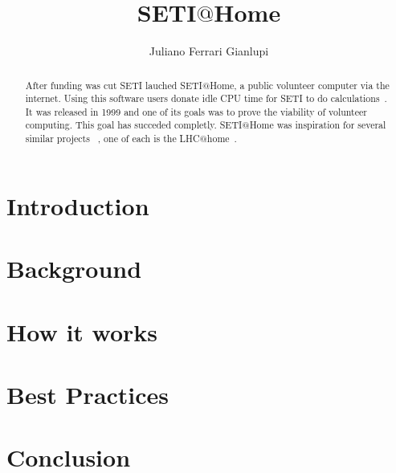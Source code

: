\title{SETI$@$Home}

\author{Juliano Ferrari Gianlupi}


\renewcommand{\shortauthors}{J. F. Gianlupi}


\begin{abstract}
After funding was cut SETI lauched SETI$@$Home, a public volunteer computer 
via the internet. Using this software users donate idle CPU time for SETI to do 
calculations~\cite{www-hid-sp18-601-sathome-about}. It was released in 1999 and 
one of its goals was to prove the viability of volunteer computing. This goal 
has succeded completly. SETI$@$Home was inspiration for several similar projects
 ~\cite{www-hid-sp18-601-boinc-projects}, one of each is the 
 LHC$@$home~\cite{www-hid-sp18-601-lhc-at-home-history}.
\end{abstract}



\maketitle

\section{Introduction}

\section{Background}

\section{How it works}


\section{Best Practices}


\section{Conclusion}

\begin{acks}

\end{acks}


 

